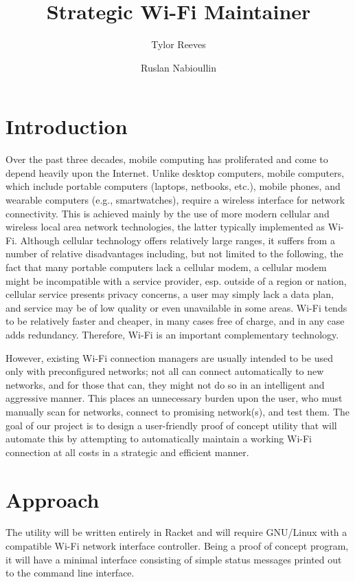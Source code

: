 \documentclass{article}
\title{Strategic Wi-Fi Maintainer}
\author{
  Tylor Reeves\\
  \and
  Ruslan Nabioullin
}
\begin{document}
\maketitle

\section{Introduction}
Over the past three decades, mobile computing has proliferated and come to
depend heavily upon the Internet. Unlike desktop computers, mobile computers,
which include portable computers (laptops, netbooks, etc.), mobile phones, and
wearable computers (e.g., smartwatches), require a wireless interface for
network connectivity. This is achieved mainly by the use of more modern cellular
and wireless local area network technologies, the latter typically implemented
as Wi-Fi. Although cellular technology offers relatively large ranges, it
suffers from a number of relative disadvantages including, but not limited to
the following, the fact that many portable computers lack a cellular modem, a
cellular modem might be incompatible with a service provider, esp. outside of a
region or nation, cellular service presents privacy concerns, a user may simply
lack a data plan, and service may be of low quality or even unavailable in some
areas. Wi-Fi tends to be relatively faster and cheaper, in many cases free of
charge, and in any case adds redundancy. Therefore, Wi-Fi is an important
complementary technology.

However, existing Wi-Fi connection managers are usually intended to be used only
with preconfigured networks; not all can connect automatically to new networks,
and for those that can, they might not do so in an intelligent and aggressive
manner. This places an unnecessary burden upon the user, who must manually scan
for networks, connect to promising network(s), and test them. The goal of our
project is to design a user-friendly proof of concept utility that will automate
this by attempting to automatically maintain a working Wi-Fi connection at all
costs in a strategic and efficient manner.

\section{Approach}
The utility will be written entirely in Racket and will require GNU/Linux with a
compatible Wi-Fi network interface controller. Being a proof of concept program,
it will have a minimal interface consisting of simple status messages printed
out to the command line interface.
\end{document}
